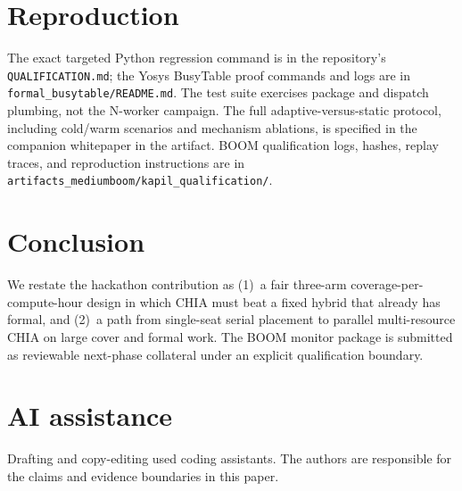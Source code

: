 \documentclass[conference,letterpaper]{IEEEtran}
\begin{document}
\section{Reproduction}

The exact targeted Python regression command is in the repository's
\texttt{QUALIFICATION.md}; the Yosys BusyTable proof commands and logs are in
\texttt{formal\_busytable/README.md}. The test suite exercises package and
dispatch plumbing, not the N-worker campaign. The full adaptive-versus-static
protocol, including cold/warm scenarios and mechanism ablations, is specified
in the companion whitepaper in the artifact. BOOM qualification logs, hashes,
replay traces, and reproduction instructions are in
\texttt{artifacts\_mediumboom/kapil\_qualification/}.

\section{Conclusion}

We restate the hackathon contribution as (1)~a fair three-arm
coverage-per-compute-hour design in which CHIA must beat a fixed hybrid that
already has formal, and (2)~a path from single-seat serial placement to
parallel multi-resource CHIA on large cover and formal work. The BOOM monitor
package is submitted as reviewable next-phase collateral under an explicit
qualification boundary.

\section*{AI assistance}
Drafting and copy-editing used coding assistants. The authors are responsible
for the claims and evidence boundaries in this paper.
\end{document}
